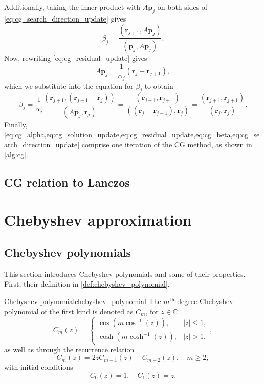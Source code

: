 Additionally, taking the inner product with $A \mathbf{p}_j$ on both sides of \cref{eq:cg_search_direction_update} gives
\[
  \beta_j = \frac{(\mathbf{r}_{j+1}, A \mathbf{p}_j)}{(\mathbf{p}_j, A \mathbf{p}_j)}.
\]
Now, rewriting \cref{eq:cg_residual_update} gives
\[
  A \mathbf{p}_j = \frac{1}{\alpha_j} (\mathbf{r}_j - \mathbf{r}_{j+1}),
\]
which we substitute into the equation for $\beta_j$ to obtain
\begin{equation}
  \beta_j = \frac{1}{\alpha_j}\frac{(\mathbf{r}_{j+1}, (\mathbf{r}_{j+1}-\mathbf{r}_j))}{(A \mathbf{p}_j, \mathbf{r}_j)} = \frac{(\mathbf{r}_{j+1},\mathbf{r}_{j+1})}{((\mathbf{r}_j - \mathbf{r}_{j-1}), \mathbf{r}_j)} = \frac{(\mathbf{r}_{j+1},\mathbf{r}_{j+1})}{(\mathbf{r}_j, \mathbf{r}_j)}.
  \label{eq:cg_beta}
\end{equation}
Finally, \cref{eq:cg_alpha,eq:cg_solution_update,eq:cg_residual_update,eq:cg_beta,eq:cg_search_direction_update} comprise one iteration of the CG method, as shown in \cref{alg:cg}.

\subsection{CG relation to Lanczos}

\section{Chebyshev approximation}\label{sec:chebyshev_approximation}

\subsection{Chebyshev polynomials}
This section introduces Chebyshev polynomials and some of their properties. First, their definition in \cref{def:chebyshev_polynomial}.
\begin{APPfancydef}{Chebyshev polynomial}{chebyshev_polynomial}
  The $m^{\text{th}}$ degree Chebyshev polynomial of the first kind is denoted as $C_m$, for $z\in\mathbb{C}$
  \[
    C_m(z) = \begin{cases}
      \cos(m \cos^{-1}(z)), & |z| \leq 1, \\
      \cosh(m \cosh^{-1}(z)), & |z| > 1,
    \end{cases},
  \]
  as well as through the recurrence relation
  \[
    C_m(z) = 2z C_{m-1}(z) - C_{m-2}(z), \quad m \geq 2,
  \]
  with initial conditions
  \[
    C_0(z) = 1, \quad C_1(z) = z.
  \]
\end{APPfancydef}

